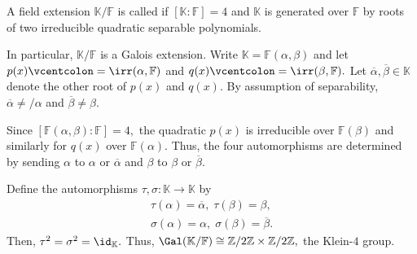 \begin{ex}
    A field extension $\mathbb{K}/\mathbb{F}$ is called  if $[\mathbb{K} : \mathbb{F}] = 4$ and $\mathbb{K}$ is generated over $\mathbb{F}$ by roots of two irreducible quadratic separable polynomials. 

    In particular, $\mathbb{K}/\mathbb{F}$ is a Galois extension. Write $\mathbb{K} = \mathbb{F}(\alpha, \beta)$ and let $p(x) \vcentcolon= \irr(\alpha, \mathbb{F})$ and $q(x) \vcentcolon= \irr(\beta, \mathbb{F}).$ Let $\overline{\alpha}, \overline{\beta} \in \mathbb{K}$ denote the other root of $p(x)$ and $q(x).$ By assumption of separability, $\overline{\alpha} \neq/ \alpha$ and $\overline{\beta} \neq \beta.$

    Since $[\mathbb{F}(\alpha, \beta) : \mathbb{F}] = 4,$ the quadratic $p(x)$ is irreducible over $\mathbb{F}(\beta)$ and similarly for $q(x)$ over $\mathbb{F}(\alpha).$ Thus, the four automorphisms are determined by sending $\alpha$ to $\alpha$ or $\overline{\alpha}$ and $\beta$ to $\beta$ or $\overline{\beta}.$

    Define the automorphisms $\tau, \sigma : \mathbb{K} \to \mathbb{K}$ by
    \begin{align*} 
        \tau(\alpha) = \overline{\alpha},\;\tau(\beta) = \beta,\\
        \sigma(\alpha) = \alpha,\;\sigma(\beta) = \overline{\beta}.
    \end{align*}
    Then, $\tau^2 = \sigma^2 = \id_{\mathbb{K}}.$ Thus, $\Gal(\mathbb{K}/\mathbb{F}) \cong \mathbb{Z}/2\mathbb{Z} \times \mathbb{Z}/2\mathbb{Z},$ the Klein-$4$ group.
\end{ex}

